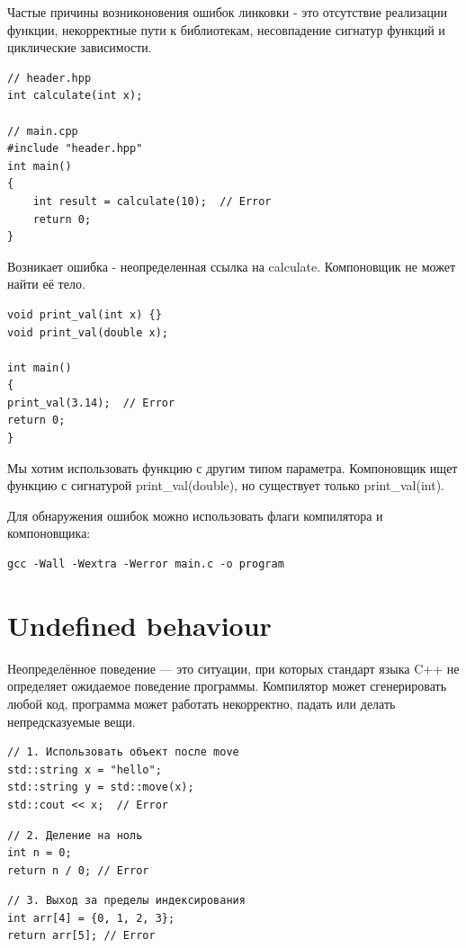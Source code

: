 \documentclass[14pt]{extreport}
\begin{document}
Частые причины возниконовения ошибок линковки - это отсутствие реализации функции, некорректные пути к библиотекам, несовпадение сигнатур функций и циклические зависимости.
\begin{verbatim}
// header.hpp
int calculate(int x);

// main.cpp
#include "header.hpp"
int main() 
{
    int result = calculate(10);  // Error
    return 0;
}
\end{verbatim}
Возникает ошибка - неопределенная ссылка на calculate. Компоновщик не может найти её тело.


\begin{verbatim}
void print_val(int x) {}
void print_val(double x); 

int main() 
{
print_val(3.14);  // Error
return 0;
}
\end{verbatim}

Мы хотим использовать функцию с другим типом параметра. Компоновщик ищет функцию с сигнатурой print\_val(double), но существует только print\_val(int).


Для обнаружения ошибок можно использовать флаги компилятора и компоновщика:
\begin{verbatim}
gcc -Wall -Wextra -Werror main.c -o program
\end{verbatim}

\newpage
{\centering\section{Undefined behaviour}}
Неопределённое поведение — это ситуации, при которых стандарт языка C++ не определяет ожидаемое поведение программы. Компилятор может сгенерировать любой код, программа может работать некорректно, падать или делать непредсказуемые вещи.

\begin{verbatim}
// 1. Использовать объект после move
std::string x = "hello";
std::string y = std::move(x);
std::cout << x;  // Error
\end{verbatim}

\begin{verbatim}
// 2. Деление на ноль
int n = 0;
return n / 0; // Error
\end{verbatim}

\begin{verbatim}
// 3. Выход за пределы индексирования
int arr[4] = {0, 1, 2, 3};
return arr[5]; // Error
\end{verbatim}
\end{document}
